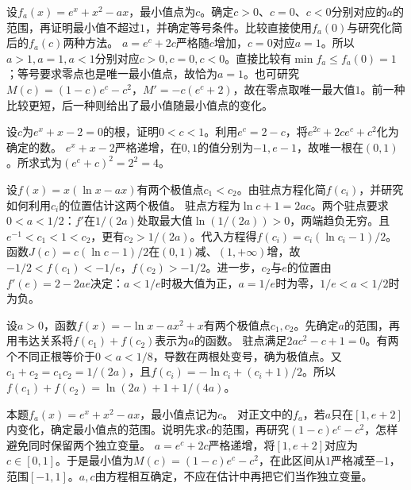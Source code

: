 设\(f_a(x)=e^x+x^2-ax\)，最小值点为\(c\)。确定\(c>0\)、\(c=0\)、\(c<0\)分别对应的\(a\)的范围，再证明最小值不超过\(1\)，并确定等号条件。比较直接使用\(f_a(0)\)与研究化简后的\(f_a(c)\)两种方法。
\solutionanswer
\(a=e^c+2c\)严格随\(c\)增加，\(c=0\)对应\(a=1\)。所以\(a>1,a=1,a<1\)分别对应\(c>0,c=0,c<0\)。直接比较有\(\min f_a\le f_a(0)=1\)；等号要求零点也是唯一最小值点，故恰为\(a=1\)。也可研究\(M(c)=(1-c)e^c-c^2\)，\(M'=-c(e^c+2)\)，故在零点取唯一最大值\(1\)。前一种比较更短，后一种则给出了最小值随最小值点的变化。


设\(c\)为\(e^x+x-2=0\)的根，证明\(0<c<1\)。利用\(e^c=2-c\)，将\(e^{2c}+2ce^c+c^2\)化为确定的数。
\solutionanswer
\(e^x+x-2\)严格递增，在\(0,1\)的值分别为\(-1,e-1\)，故唯一根在\((0,1)\)。所求式为\((e^c+c)^2=2^2=4\)。


设\(f(x)=x(\ln x-ax)\)有两个极值点\(c_1<c_2\)。由驻点方程化简\(f(c_i)\)，并研究如何利用\(c_i\)的位置估计这两个极值。
\solutionanswer
驻点方程为\(\ln c+1=2ac\)。两个驻点要求\(0<a<1/2\)：\(f'\)在\(1/(2a)\)处取最大值\(\ln(1/(2a))>0\)，两端趋负无穷。且\(e^{-1}<c_1<1<c_2\)，更有\(c_2>1/(2a)\)。代入方程得\(f(c_i)=c_i(\ln c_i-1)/2\)。函数\(J(c)=c(\ln c-1)/2\)在\((0,1)\)减、\((1,+\infty)\)增，故\(-1/2<f(c_1)<-1/e\)，\(f(c_2)>-1/2\)。进一步，\(c_2\)与\(e\)的位置由\(f'(e)=2-2ae\)决定：\(a<1/e\)时极大值为正，\(a=1/e\)时为零，\(1/e<a<1/2\)时为负。


设\(a>0\)，函数\(f(x)=-\ln x-ax^2+x\)有两个极值点\(c_1,c_2\)。先确定\(a\)的范围，再用韦达关系将\(f(c_1)+f(c_2)\)表示为\(a\)的函数。
\solutionanswer
驻点满足\(2ac^2-c+1=0\)。有两个不同正根等价于\(0<a<1/8\)，导数在两根处变号，确为极值点。又\(c_1+c_2=c_1c_2=1/(2a)\)，且\(f(c_i)=-\ln c_i+(c_i+1)/2\)。所以\(f(c_1)+f(c_2)=\ln(2a)+1+1/(4a)\)。


本题\(f_a(x)=e^x+x^2-ax\)，最小值点记为\(c\)。
对正文中的\(f_a\)，若\(a\)只在\([1,e+2]\)内变化，确定最小值点的范围。说明先求\(c\)的范围，再研究\((1-c)e^c-c^2\)，怎样避免同时保留两个独立变量。
\solutionanswer
\(a=e^c+2c\)严格递增，将\([1,e+2]\)对应为\(c\in[0,1]\)。于是最小值为\(M(c)=(1-c)e^c-c^2\)，在此区间从\(1\)严格减至\(-1\)，范围\([-1,1]\)。\(a,c\)由方程相互确定，不应在估计中再把它们当作独立变量。


